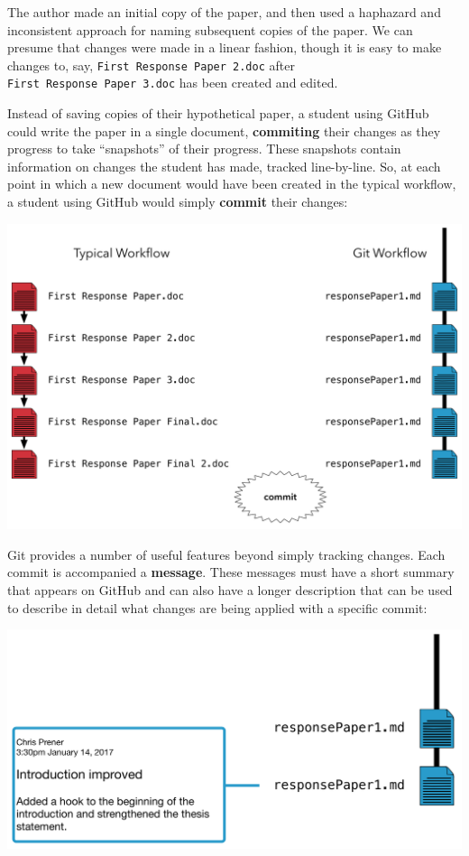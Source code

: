 \documentclass[]{book}
\theoremstyle{definition}
\theoremstyle{definition}
\theoremstyle{remark}
\begin{document}
The author made an initial copy of the paper, and then used a haphazard
and inconsistent approach for naming subsequent copies of the paper. We
can presume that changes were made in a linear fashion, though it is
easy to make changes to, say, \texttt{First\ Response\ Paper\ 2.doc}
after \texttt{First\ Response\ Paper\ 3.doc} has been created and
edited.

Instead of saving copies of their hypothetical paper, a student using
GitHub could write the paper in a single document, \textbf{commiting}
their changes as they progress to take ``snapshots'' of their progress.
These snapshots contain information on changes the student has made,
tracked line-by-line. So, at each point in which a new document would
have been created in the typical workflow, a student using GitHub would
simply \textbf{commit} their changes:

\includegraphics[width=1\linewidth]{images/gitFlow02}

Git provides a number of useful features beyond simply tracking changes.
Each commit is accompanied a \textbf{message}. These messages must have
a short summary that appears on GitHub and can also have a longer
description that can be used to describe in detail what changes are
being applied with a specific commit:

\includegraphics[width=1\linewidth]{images/gitFlow03}
\end{document}
